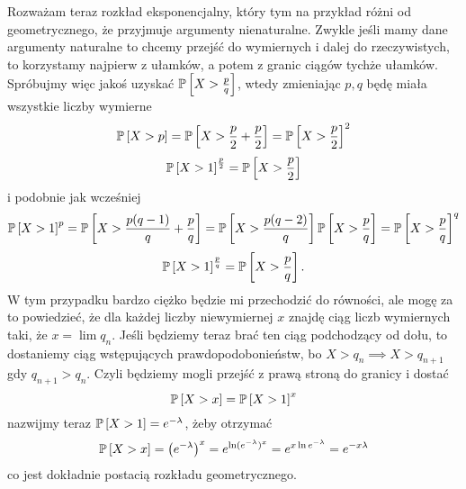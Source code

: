 \documentclass{article}
\begin{document}
Rozważam teraz rozkład eksponencjalny, który tym na przykład różni od geometrycznego, że przyjmuje argumenty nienaturalne. Zwykle jeśli mamy dane argumenty naturalne to chcemy przejść do wymiernych i dalej do rzeczywistych, to korzystamy najpierw z ułamków, a potem z granic ciągów tychże ułamków. Spróbujmy więc jakoś uzyskać $\prob{X>\frac{p}{q}}$, wtedy zmieniając $p,q$ będę miała wszystkie liczby wymierne
$$\prob{X>p}=\prob{X>\frac{p}{2}+\frac{p}{2}}=\prob{X>\frac{p}{2}}^2$$
$$\prob{X>1}^{\frac{p}{2}}=\prob{X>\frac{p}{2}}$$
i podobnie jak wcześniej
$$\prob{X>1}^p=\prob{X>\frac{p(q-1)}{q}+\frac{p}{q}}=\prob{X>\frac{p(q-2)}{q}}\prob{X>\frac{p}{q}}=\prob{X>\frac{p}{q}}^q$$
$$\prob{X>1}^{\frac{p}{q}}=\prob{X>\frac{p}{q}}.$$
W tym przypadku bardzo ciężko będzie mi przechodzić do równości, ale mogę za to powiedzieć, że dla każdej liczby niewymiernej $x$ znajdę ciąg liczb wymiernych taki, że $x=\lim q_n$. Jeśli będziemy teraz brać ten ciąg podchodzący od dołu, to dostaniemy ciąg wstępujących prawdopodobonieństw, bo $X>q_n\implies X>q_{n+1}$ gdy $q_{n+1}>q_n$. Czyli będziemy mogli przejść z prawą stroną do granicy i dostać
$$\prob{X>x}=\prob{X>1}^x$$
nazwijmy teraz $\prob{X>1}=e^{-\lambda}$, żeby otrzymać
$$\prob{X>x}=\left(e^{-\lambda}\right)^x=e^{\ln(e^{-\lambda})^x}=e^{x\ln e^{-\lambda}}=e^{-x\lambda}$$
co jest dokładnie postacią rozkładu geometrycznego.
\end{document}
